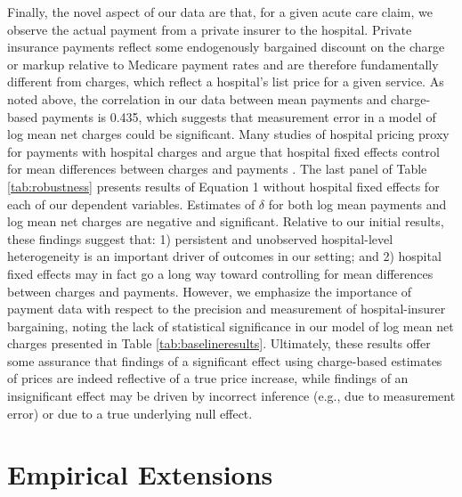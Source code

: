 \documentclass[12pt]{article}
\begin{document}
Finally, the novel aspect of our data are that, for a given acute care claim, we observe the actual payment from a private insurer to the hospital. Private insurance payments reflect some endogenously bargained discount on the charge or markup relative to Medicare payment rates and are therefore fundamentally different from charges, which reflect a hospital's list price for a given service. As noted above, the correlation in our data between mean payments and charge-based payments is 0.435, which suggests that measurement error in a model of log mean net charges could be significant. Many studies of hospital pricing proxy for payments with hospital charges and argue that hospital fixed effects control for mean differences between charges and payments \citep{cutler2000}. The last panel of Table \ref{tab:robustness} presents results of Equation 1 without hospital fixed effects for each of our dependent variables.  Estimates of $\delta$ for both log mean payments and log mean net charges are negative and significant. Relative to our initial results, these findings suggest that: 1) persistent and unobserved hospital-level heterogeneity is an important driver of outcomes in our setting; and 2) hospital fixed effects may in fact go a long way toward controlling for mean differences between charges and payments. However, we emphasize the importance of payment data with respect to the precision and measurement of hospital-insurer bargaining, noting the lack of statistical significance in our model of log mean net charges presented in Table \ref{tab:baselineresults}. Ultimately, these results offer some assurance that findings of a significant effect using charge-based estimates of prices are indeed reflective of a true price increase, while findings of an insignificant effect may be driven by incorrect inference (e.g., due to measurement error) or due to a true underlying null effect.

\section{Empirical Extensions}
\label{sec:Ext}
\end{document}
